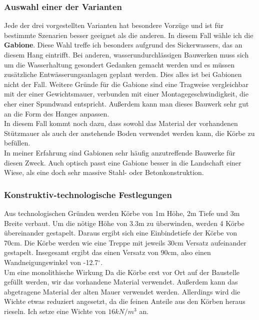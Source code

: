 \documentclass[11pt,fleqn,a4paper]{article}
\begin{document}
\subsubsection*{Auswahl einer der Varianten}
Jede der drei vorgestellten Varianten hat besondere Vorzüge und ist für bestimmte Szenarien besser geeignet als die anderen. In diesem Fall wähle ich die \textbf{Gabione}. Diese Wahl treffe ich besonders aufgrund des Sickerwassers, das an diesem Hang eintrifft. Bei anderen, wasserundurchlässigen Bauwerken muss sich um die Wasserhaltung gesondert Gedanken gemacht werden und es müssen zusätzliche Entwässerungsanlagen geplant werden. Dies alles ist bei Gabionen nicht der Fall. Weitere Gründe für die Gabione sind eine Tragweise vergleichbar mit der einer Gewichtsmauer, verbunden mit einer Montagegeschwindigkeit, die eher einer Spundwand entspricht. Außerdem kann man dieses Bauwerk sehr gut an die Form des Hanges anpassen. \\
In diesem Fall kommt noch dazu, dass sowohl das Material der vorhandenen Stützmauer als auch der anstehende Boden verwendet werden kann, die Körbe zu befüllen. \\
In meiner Erfahrung sind Gabionen sehr häufig anzutreffende Bauwerke für diesen Zweck. Auch optisch passt eine Gabione besser in die Landschaft einer Wiese, als eine doch sehr massive Stahl- oder Betonkonstruktion.
\subsubsection*{Konstruktiv-technologische Festlegungen}
Aus technologischen Gründen werden Körbe von 1m Höhe, 2m Tiefe und 3m Breite verbaut. Um die nötige Höhe von 3.3m zu überwinden, werden 4 Körbe übereinander gestapelt. Daraus ergibt sich eine Einbindetiefe der Körbe von 70cm. Die Körbe werden wie eine Treppe mit jeweils 30cm Versatz aufeinander gestapelt. Insegesamt ergibt das einen Versatz von 90cm, also einen Wandneigungswinkel von -12.7$^\circ$.\\
Um eine monolithische Wirkung 
Da die Körbe erst vor Ort auf der Baustelle gefüllt werden, wir das vorhandene Material verwendet. Außerdem kann das abgetragene Material der alten Mauer verwendet werden. Allerdings wird die Wichte etwas reduziert angesetzt, da die feinen Anteile aus den Körben heraus rieseln. Ich setze eine Wichte von $16kN/m^3$ an. 
\newpage
\end{document}
